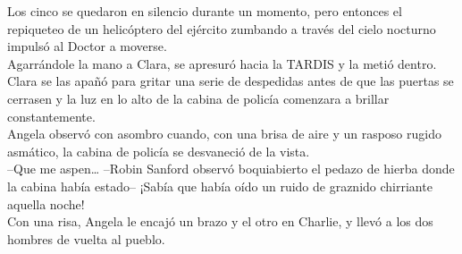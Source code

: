 Los cinco se quedaron en silencio durante un momento, pero entonces el
repiqueteo de un helicóptero del ejército zumbando a través del cielo
nocturno impulsó al Doctor a moverse.\\
Agarrándole la mano a Clara, se apresuró hacia la TARDIS y la metió
dentro. Clara se las apañó para gritar una serie de despedidas antes de
que las puertas se cerrasen y la luz en lo alto de la cabina de policía
comenzara a brillar constantemente.\\
Angela observó con asombro cuando, con una brisa de aire y un rasposo
rugido asmático, la cabina de policía se desvaneció de la vista.\\
--Que me aspen\ldots{} --Robin Sanford observó boquiabierto el pedazo de
hierba donde la cabina había estado-- ¡Sabía que había oído un ruido de
graznido chirriante aquella noche!\\
Con una risa, Angela le encajó un brazo y el otro en Charlie, y llevó a
los dos hombres de vuelta al pueblo.\\

